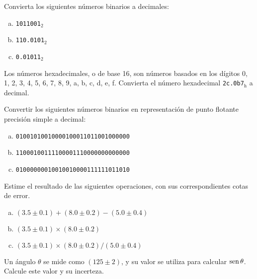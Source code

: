 \documentclass[11pt]{article}
\begin{document}
\begin{question} %
	Convierta los siguientes números binarios a decimales:
	\begin{enumerate}[a)]
		\item \texttt{1011001}$_2$
		\item \texttt{110.0101}$_2$
		\item \texttt{0.01011}$_2$
	\end{enumerate}
\end{question}

\begin{question} %
	Los números hexadecimales, o de base 16, son números basados en los dígitos 0, 1, 2, 3, 4, 5, 6, 7, 8, 9, a, b, c, d, e, f. Convierta el número hexadecimal \texttt{2c.0b7}$_{\text{h}}$ a decimal.
\end{question}

\begin{question}
	Convertir los siguientes números binarios en representación de punto flotante precisión simple a decimal:
	\begin{enumerate}[a)]
		\item \texttt{01001010010000100011011001000000} %
		\item \texttt{11000100111100001110000000000000} %
		\item \texttt{01000000010010010000111111011010} %
	\end{enumerate}
\end{question}

\begin{question}
	Estime el resultado de las siguientes operaciones, con sus correspondientes cotas de error.
	\begin{enumerate}[a)]
		\item $(3.5 \pm 0.1) + (8.0 \pm 0.2) - (5.0 \pm 0.4)$
		\item $(3.5 \pm 0.1) \times (8.0 \pm 0.2) $
		\item $(3.5 \pm 0.1) \times (8.0 \pm 0.2) / (5.0 \pm 0.4)$
	\end{enumerate}
\end{question}

\begin{question} %
	Un ángulo $\theta$ se mide como $(125 \pm 2)$\textdegree, y su valor se utiliza para calcular $\operatorname{sen} \theta$. Calcule este valor y su incerteza.
\end{question}
\end{document}
